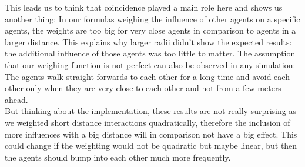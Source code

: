 \noi This leads us to think that coincidence played a main role here and shows us another thing: In our formulas weighing the influence of other agents on a specific agents, the weights are too big for very close agents in comparison to agents in a larger distance. This explains why larger radii didn't show the expected results: the additional influence of those agents was too little to matter. The assumption that our weighing function is not perfect can also be observed in any simulation: The agents walk straight forwards to each other for a long time and avoid each other only when they are very close to each other and not from a few meters ahead.\\
\noi But thinking about the implementation, these results are not really surprising as we weighted short distance interactions quadratically, therefore the inclusion of more influences with a big distance will in comparison not have a big effect. This could change if the weighting would not be quadratic but maybe linear, but then the agents should bump into each other much more frequently.\\

